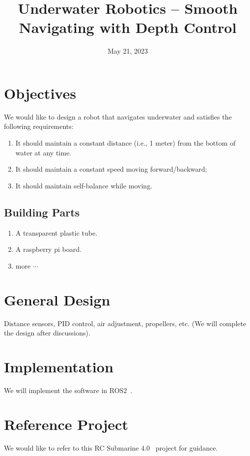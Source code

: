 \documentclass[11pt, oneside]{article}   	%
\title{Underwater Robotics -- Smooth Navigating with Depth Control}
\date{May 21, 2023}							%
\begin{document}
\maketitle

\section{Objectives}
We would like to design a robot that navigates underwater and satisfies the following requirements:
\begin{enumerate}
\item It should maintain a constant distance (i.e., 1 meter) from the bottom of water at any time.
\item It should maintain a constant speed moving forward/backward;
\item It should maintain self-balance while moving.
\end{enumerate}


\subsection{Building Parts}
\begin{enumerate}
\item A transparent plastic tube.
\item A raspberry pi board.
\item more $\cdots$ 
\end{enumerate}

\section{General Design}
Distance sensors, PID control, air adjustment, propellers, etc. (We will complete the design after discussions).

\section{Implementation}
We will implement the software in ROS2~\cite{doi:10.1126/scirobotics.abm6074}.

\section{Reference Project}
We would like to refer to this RC Submarine 4.0~\cite{ref:bec, ref:becv} project for guidance.



 
\end{document}
